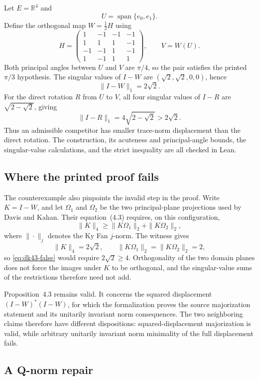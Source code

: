 \documentclass[11pt]{article}
\begin{document}
Let $E=\mathbb{R}^4$ and
\[
  U=\operatorname{span}\{e_0,e_1\}.
\]
Define the orthogonal map $W=\tfrac12 H$ using
\[
H=
\begin{pmatrix}
 1&-1&-1&-1\\
 1& 1& 1&-1\\
-1&-1& 1&-1\\
 1&-1& 1& 1
\end{pmatrix},
\qquad
V=W(U).
\]
Both principal angles between $U$ and $V$ are $\pi/4$, so the pair satisfies
the printed $\pi/3$ hypothesis.  The singular values of $I-W$ are
$(\sqrt2,\sqrt2,0,0)$, hence
\[
  \|I-W\|_1=2\sqrt2.
\]
For the direct rotation $R$ from $U$ to $V$, all four singular values of $I-R$
are $\sqrt{2-\sqrt2}$, giving
\[
  \|I-R\|_1=4\sqrt{2-\sqrt2}>2\sqrt2.
\]
Thus an admissible competitor has smaller trace-norm displacement than the
direct rotation.  The construction, its acuteness and principal-angle bounds,
the singular-value calculations, and the strict inequality are all checked in
Lean.

\subsection{Where the printed proof fails}

The counterexample also pinpoints the invalid step in the proof.  Write
$K=I-W$, and let $\Omega_1$ and $\Omega_2$ be the two principal-plane
projections used by Davis and Kahan.  Their equation~(4.3) requires, on this
configuration,
\begin{equation}
  \|K\|_4
  \geq
  \|K\Omega_1\|_2+\|K\Omega_2\|_2,
  \label{eq:dk43-false}
\end{equation}
where $\|\cdot\|_j$ denotes the Ky Fan $j$-norm.  The witness gives
\[
  \|K\|_4=2\sqrt2,
  \qquad
  \|K\Omega_1\|_2=\|K\Omega_2\|_2=2,
\]
so \cref{eq:dk43-false} would require $2\sqrt2\ge4$.  Orthogonality of the two
domain planes does not force the images under $K$ to be orthogonal, and the
singular-value sums of the restrictions therefore need not add.

Proposition~4.3 remains valid.  It concerns the squared displacement
$(I-W)^*(I-W)$, for which the formalization proves the source majorization
statement and its unitarily invariant norm consequences.  The two neighboring
claims therefore have different dispositions: squared-displacement
majorization is valid, while arbitrary unitarily invariant norm minimality of
the full displacement fails.

\subsection{A Q-norm repair}
\end{document}
